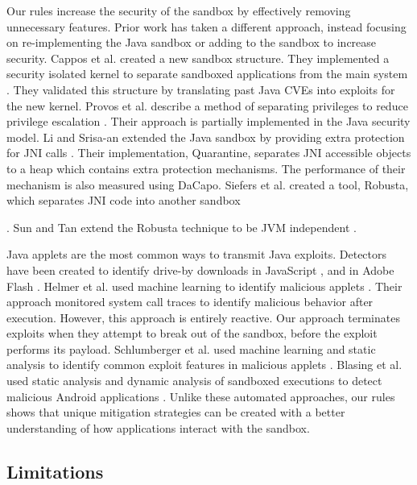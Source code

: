 \documentclass{sig-alternate}
\begin{document}
Our rules increase the security of the sandbox
by effectively removing unnecessary features. Prior work has taken a different
approach, instead focusing on re-implementing the Java sandbox or
adding to the sandbox to increase security. Cappos et al. created
a new sandbox structure. They implemented a security isolated kernel
to separate sandboxed applications from the main system \cite{cappos_retaining_2010}.
They validated this structure by translating past Java CVEs into exploits
for the new kernel. Provos et al. describe a method of separating
privileges to reduce privilege escalation \cite{Provos-PrivilegeEscalation}.
Their approach is partially implemented in the Java security model.
Li and Srisa-an extended the Java sandbox by providing extra protection
for JNI calls \cite{li_quarantine:_2011}. Their implementation, Quarantine,
separates JNI accessible objects to a heap which contains extra protection
mechanisms. The performance of their mechanism is also measured using
DaCapo. Siefers et al. created a tool, Robusta, which separates JNI
code into another sandbox \cite{siefers_robusta:_2010}%

. Sun and Tan extend the Robusta technique to be JVM independent \cite{sun_jvm-portable_2012}. 

Java applets are the most common ways to transmit Java exploits. Detectors
have been created to identify drive-by downloads in JavaScript \cite{cova_detection_2010},
and in Adobe Flash \cite{ford_analyzing_2009}. Helmer et al. used
machine learning to identify malicious applets \cite{helmer_anomalous_2001}.
Their approach monitored system call traces to identify malicious
behavior after execution. However, this approach is entirely reactive.
Our approach terminates exploits when they attempt to break out of
the sandbox, before the exploit performs its payload. Schlumberger
et al. used machine learning and static analysis to identify common
exploit features in malicious applets \cite{schlumberger_jarhead_2012}.
Blasing et al. used static analysis and dynamic analysis of sandboxed
executions to detect malicious Android applications \cite{Blasing-AndriodSandbox}.
Unlike these automated approaches, our rules shows that unique
mitigation strategies can be created with a better understanding of
how applications interact with the sandbox. 

\subsection{Limitations}
\end{document}

